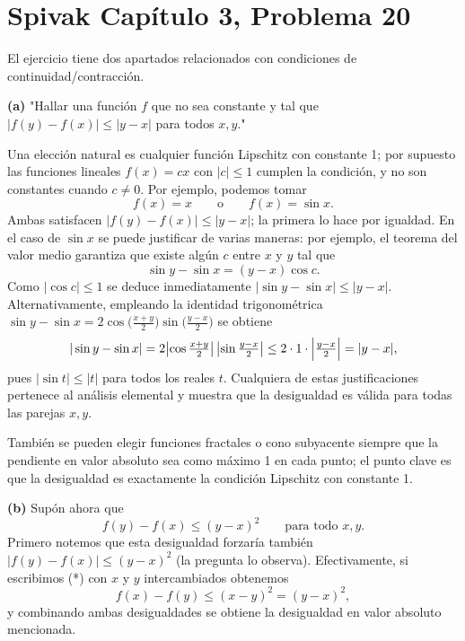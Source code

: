 \section*{Spivak Capítulo 3, Problema 20}

El ejercicio tiene dos apartados relacionados con condiciones de
continuidad/contracción.

\textbf{(a)} "Hallar una función $f$ que no sea constante y tal que
$|f(y)-f(x)|\le |y-x|$ para todos $x,y$." 

Una elección natural es cualquier función Lipschitz con constante 1; por
supuesto las funciones lineales $f(x)=cx$ con $|c|\le 1$ cumplen la
condición, y no son constantes cuando $c\neq0$. Por ejemplo, podemos tomar
\[ f(x)=x \qquad\text{o} \qquad f(x)=\sin x.\]
Ambas satisfacen $|f(y)-f(x)|\le |y-x|$; la primera lo hace por igualdad.
En el caso de $\sin x$ se puede justificar de varias maneras: por ejemplo,
el teorema del valor medio garantiza que existe algún $c$ entre $x$ y $y$ tal
que
\[\sin y-\sin x = (y-x)\cos c.\]
Como $|\cos c|\le1$ se deduce inmediatamente
$|\sin y-\sin x|\le |y-x|$. Alternativamente, empleando la identidad trigonométrica
$\sin y-\sin x = 2\cos\bigl(\tfrac{x+y}{2}\bigr)\sin\bigl(\tfrac{y-x}{2}\bigr)$
se obtiene
\[|\sin y-\sin x| = 2\bigl|\cos\tfrac{x+y}{2}\bigr|\,\bigl|\sin\tfrac{y-x}{2}\bigr|
\le 2\cdot1\cdot\Bigl|\tfrac{y-x}{2}\Bigr| = |y-x|,
\]
pues $|\sin t|\le|t|$ para todos los reales $t$. Cualquiera de estas
justificaciones pertenece al análisis elemental y muestra que la desigualdad
es válida para todas las parejas $x,y$.

También se pueden elegir funciones fractales o cono subyacente siempre que
la pendiente en valor absoluto sea como máximo 1 en cada punto; el punto
clave es que la desigualdad es exactamente la condición Lipschitz con
constante 1.

\textbf{(b)} Supón ahora que
$$f(y)-f(x)\le (y-x)^2\qquad\text{para todo }x,y.\tag{*}$$
Primero notemos que esta desigualdad forzaría también
$|f(y)-f(x)|\le (y-x)^2$ (la pregunta lo observa). Efectivamente, si escribimos
(*) con $x$ y $y$ intercambiados obtenemos
$$f(x)-f(y)\le (x-y)^2=(y-x)^2,$$
y combinando ambas desigualdades se obtiene la desigualdad en valor
absoluto mencionada.

